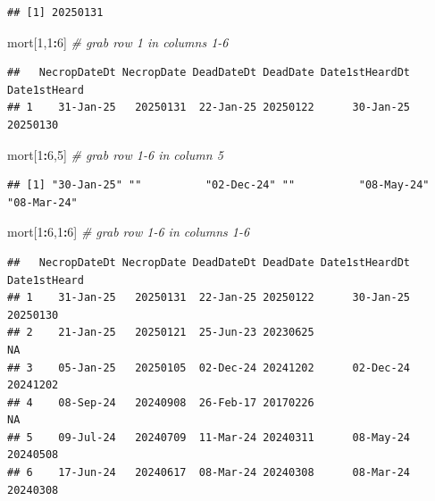 \documentclass[
]{book}
\newenvironment{Shaded}{\begin{snugshade}}{\end{snugshade}}
\newcommand{\CommentTok}[1]{\textcolor[rgb]{0.56,0.35,0.01}{\textit{#1}}}
\newcommand{\DecValTok}[1]{\textcolor[rgb]{0.00,0.00,0.81}{#1}}
\newcommand{\NormalTok}[1]{#1}
\newcommand{\SpecialCharTok}[1]{\textcolor[rgb]{0.81,0.36,0.00}{\textbf{#1}}}
\begin{document}
\begin{verbatim}
## [1] 20250131
\end{verbatim}

\begin{Shaded}
\begin{Highlighting}[]
\NormalTok{mort[}\DecValTok{1}\NormalTok{,}\DecValTok{1}\SpecialCharTok{:}\DecValTok{6}\NormalTok{] }\CommentTok{\# grab row 1 in columns 1{-}6}
\end{Highlighting}
\end{Shaded}

\begin{verbatim}
##   NecropDateDt NecropDate DeadDateDt DeadDate Date1stHeardDt Date1stHeard
## 1    31-Jan-25   20250131  22-Jan-25 20250122      30-Jan-25     20250130
\end{verbatim}

\begin{Shaded}
\begin{Highlighting}[]
\NormalTok{mort[}\DecValTok{1}\SpecialCharTok{:}\DecValTok{6}\NormalTok{,}\DecValTok{5}\NormalTok{] }\CommentTok{\# grab row 1{-}6 in column 5}
\end{Highlighting}
\end{Shaded}

\begin{verbatim}
## [1] "30-Jan-25" ""          "02-Dec-24" ""          "08-May-24" "08-Mar-24"
\end{verbatim}

\begin{Shaded}
\begin{Highlighting}[]
\NormalTok{mort[}\DecValTok{1}\SpecialCharTok{:}\DecValTok{6}\NormalTok{,}\DecValTok{1}\SpecialCharTok{:}\DecValTok{6}\NormalTok{] }\CommentTok{\# grab row 1{-}6 in columns 1{-}6}
\end{Highlighting}
\end{Shaded}

\begin{verbatim}
##   NecropDateDt NecropDate DeadDateDt DeadDate Date1stHeardDt Date1stHeard
## 1    31-Jan-25   20250131  22-Jan-25 20250122      30-Jan-25     20250130
## 2    21-Jan-25   20250121  25-Jun-23 20230625                          NA
## 3    05-Jan-25   20250105  02-Dec-24 20241202      02-Dec-24     20241202
## 4    08-Sep-24   20240908  26-Feb-17 20170226                          NA
## 5    09-Jul-24   20240709  11-Mar-24 20240311      08-May-24     20240508
## 6    17-Jun-24   20240617  08-Mar-24 20240308      08-Mar-24     20240308
\end{verbatim}
\end{document}
